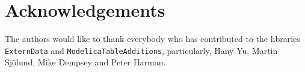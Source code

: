 \documentclass{modelica}
\newcommand{\modelica}[1]{\lstinline[language=modelica]|#1|}
\begin{document}

\section*{Acknowledgements}

The authors would like to thank everybody who has contributed to the libraries \modelica{ExternData} and \modelica{ModelicaTableAdditions}, particularly, Hany Yu, Martin Sjölund, Mike Dempsey and Peter Harman.

\printbibliography
\end{document}
